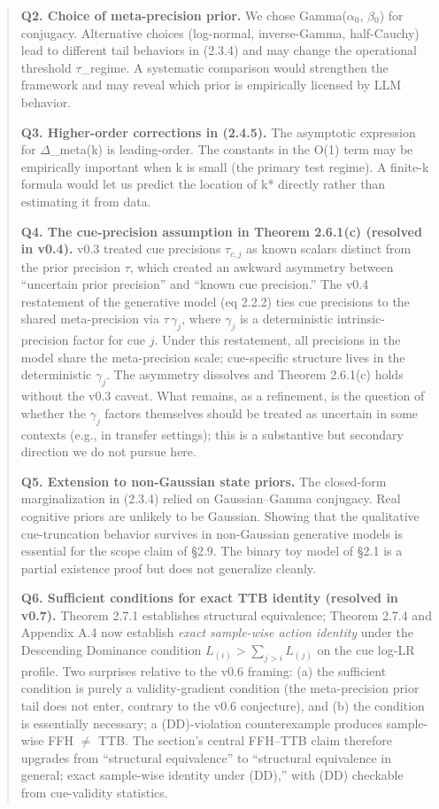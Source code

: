 \documentclass{article}
\begin{document}
\begin{quote}
\textbf{Q2. Choice of meta-precision prior.} We chose Gamma(\ensuremath{\alpha}\ensuremath{_{0}}, \ensuremath{\beta}\ensuremath{_{0}}) for
conjugacy. Alternative choices (log-normal, inverse-Gamma, half-Cauchy)
lead to different tail behaviors in (2.3.4) and may change the
operational threshold \ensuremath{\tau}\_regime. A systematic comparison would
strengthen the framework and may reveal which prior is empirically
licensed by LLM behavior.

\textbf{Q3. Higher-order corrections in (2.4.5).} The asymptotic
expression for \ensuremath{\Delta}\_meta(k) is leading-order. The constants in the O(1)
term may be empirically important when k is small (the primary test
regime). A finite-k formula would let us predict the location of k*
directly rather than estimating it from data.

\textbf{Q4. The cue-precision assumption in Theorem 2.6.1(c) (resolved
in v0.4).} v0.3 treated cue precisions \(\tau_{c,j}\) as known scalars
distinct from the prior precision \(\tau\), which created an awkward
asymmetry between ``uncertain prior precision'' and ``known cue
precision.'' The v0.4 restatement of the generative model (eq 2.2.2)
ties cue precisions to the shared meta-precision via
\(\tau\,\gamma_{j}\), where \(\gamma_{j}\) is a deterministic
intrinsic-precision factor for cue \(j\). Under this restatement, all
precisions in the model share the meta-precision scale; cue-specific
structure lives in the deterministic \(\gamma_{j}\). The asymmetry
dissolves and Theorem 2.6.1(c) holds without the v0.3 caveat. What
remains, as a refinement, is the question of whether the \(\gamma_{j}\)
factors themselves should be treated as uncertain in some contexts
(e.g., in transfer settings); this is a substantive but secondary
direction we do not pursue here.

\textbf{Q5. Extension to non-Gaussian state priors.} The closed-form
marginalization in (2.3.4) relied on Gaussian--Gamma conjugacy. Real
cognitive priors are unlikely to be Gaussian. Showing that the
qualitative cue-truncation behavior survives in non-Gaussian generative
models is essential for the scope claim of \S{}2.9. The binary toy model of
\S{}2.1 is a partial existence proof but does not generalize cleanly.

\textbf{Q6. Sufficient conditions for exact TTB identity (resolved in
v0.7).} Theorem 2.7.1 establishes structural equivalence; Theorem 2.7.4
and Appendix A.4 now establish \emph{exact sample-wise action identity}
under the Descending Dominance condition
\(L_{(i)} > \sum_{j > i}^{}L_{(j)}\) on the cue log-LR profile. Two
surprises relative to the v0.6 framing: (a) the sufficient condition is
purely a validity-gradient condition (the meta-precision prior tail does
not enter, contrary to the v0.6 conjecture), and (b) the condition is
essentially necessary; a (DD)-violation counterexample produces
sample-wise FFH \ensuremath{\neq} TTB. The section's central FFH--TTB claim therefore
upgrades from ``structural equivalence'' to ``structural equivalence in
general; exact sample-wise identity under (DD),'' with (DD) checkable
from cue-validity statistics.


\end{quote}
\end{document}
